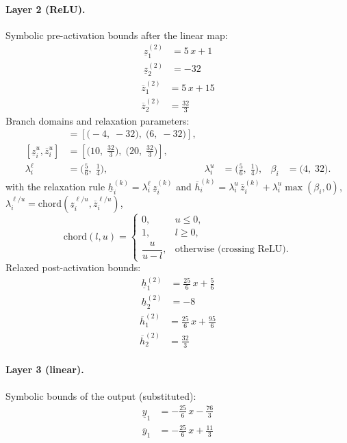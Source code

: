\documentclass[11pt]{article}
\begin{document}
\paragraph{Layer 2 (ReLU).}
Symbolic pre-activation bounds after the linear map:
\begin{align*}
\underline{z}^{(2)}_{1} &= 5\,x + 1 \\
\underline{z}^{(2)}_{2} &= -32
\end{align*}
\begin{align*}
\overline{z}^{(2)}_{1} &= 5\,x + 15 \\
\overline{z}^{(2)}_{2} &= \frac{32}{3}
\end{align*}
Branch domains and relaxation parameters:
\begin{align*}
[\underline{z}^{\ell}_i, \overline{z}^{\ell}_i] &= [\bigl(-4,\; -32\bigr),\; \bigl(6,\; -32\bigr)], \\ 
[\underline{z}^{u}_i, \overline{z}^{u}_i] &= [\bigl(10,\; \frac{32}{3}\bigr),\; \bigl(20,\; \frac{32}{3}\bigr)], \\
\lambda^{\ell}_i &= \bigl(\frac{5}{6},\; \frac{1}{4}\bigr), & \lambda^{u}_i &= \bigl(\frac{5}{6},\; \frac{1}{4}\bigr), & \beta_i &= \bigl(4,\; 32\bigr).
\end{align*}
with the relaxation rule
$\underline{h}^{(k)}_i = \lambda^{\ell}_i\, \underline{z}^{(k)}_i$ and
$\overline{h}^{(k)}_i = \lambda^{u}_i\, \overline{z}^{(k)}_i + \lambda^{u}_i \max(\beta_i, 0)$,
$\lambda^{\ell/u}_i = \mathrm{chord}(\underline{z}_i^{\ell/u}, \overline{z}_i^{\ell/u})$,
\[
\mathrm{chord}(l, u) =
\begin{cases}
0, & u \le 0,\\
1, & l \ge 0,\\
\dfrac{u}{u - l}, & \text{otherwise (crossing ReLU)}.
\end{cases}\]
Relaxed post-activation bounds:
\begin{align*}
\underline{h}^{(2)}_{1} &= \frac{25}{6}\,x + \frac{5}{6} \\
\underline{h}^{(2)}_{2} &= -8
\end{align*}
\begin{align*}
\overline{h}^{(2)}_{1} &= \frac{25}{6}\,x + \frac{95}{6} \\
\overline{h}^{(2)}_{2} &= \frac{32}{3}
\end{align*}
\paragraph{Layer 3 (linear).}
Symbolic bounds of the output (substituted):
\begin{align*}
\underline{y}_{1} &= -\frac{25}{6}\,x - \frac{76}{3}
\end{align*}
\begin{align*}
\overline{y}_{1} &= -\frac{25}{6}\,x + \frac{11}{3}
\end{align*}
\end{document}

